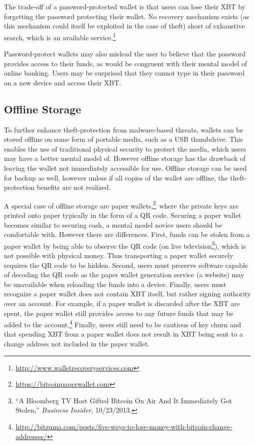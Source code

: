 The trade-off of a password-protected wallet is that users can lose their XBT by forgetting the password protecting their wallet. No recovery mechanism exists (as this mechanism could itself be exploited in the case of theft) short of exhaustive search, which is an available service.\footnote{\url{http://www.walletrecoveryservices.com}}

Password-protect wallets may also mislead the user to believe that the password provides access to their funds, as would be congruent with their mental model of online banking. Users may be surprised that they cannot type in their password on a new device and access their XBT. 

\subsection{Offline Storage}
\label{sec:offline storage}

To further enhance theft-protection from malware-based threats, wallets can be stored offline on some form of portable media, such as a USB thumbdrive. This enables the use of traditional physical security to protect the media, which users may have a better mental model of. However offline storage has the drawback of leaving the wallet not immediately accessible for use. Offline storage can be used for backup as well, however unless if all copies of the wallet are offline, the theft-protection benefits are not realized. 

A special case of offline storage are paper wallets,\footnote{\url {https://bitcoinpaperwallet.com}}\ where the private keys are printed onto paper typically in the form of a QR code. Securing a paper wallet becomes similar to securing cash, a mental model novice users should be comfortable with. However there are differences. First, funds can be stolen from a paper wallet by being able to observe the QR code (\eg on live television\footnote{``A Bloomberg TV Host Gifted Bitcoin On Air And It Immediately Got Stolen,'' \textit{Business Insider}, 10/23/2013.}), which is not possible with physical money. Thus transporting a paper wallet securely requires the QR code to be hidden. Second, users must preserve software capable of decoding the QR code as the paper wallet generation service (\eg a website) may be unavailable when reloading the funds into a device. Finally, users must recognize a paper wallet does not contain XBT itself, but rather signing authority over an account. For example, if a paper wallet is discarded after the XBT are spent, the paper wallet still provides access to any future funds that may be added to the account.\footnote{\url{http://bitzuma.com/posts/five-ways-to-lose-money-with-bitcoin-change-addresses/}} Finally, users still need to be cautious of key churn and that spending XBT from a paper wallet does not result in XBT being sent to a change address not included in the paper wallet. 

